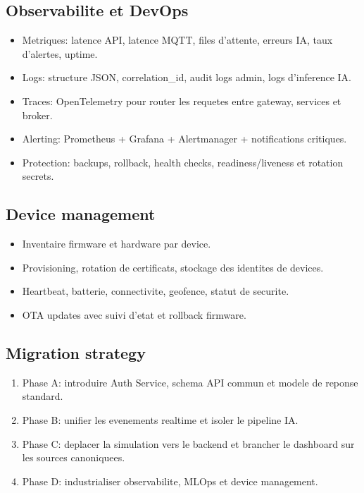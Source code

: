 \documentclass[12pt,a4paper]{article}
\begin{document}
\subsection{Observabilite et DevOps}
\begin{itemize}
  \item Metriques: latence API, latence MQTT, files d'attente, erreurs IA, taux d'alertes, uptime.
  \item Logs: structure JSON, correlation\_id, audit logs admin, logs d'inference IA.
  \item Traces: OpenTelemetry pour router les requetes entre gateway, services et broker.
  \item Alerting: Prometheus + Grafana + Alertmanager + notifications critiques.
  \item Protection: backups, rollback, health checks, readiness/liveness et rotation secrets.
\end{itemize}

\subsection{Device management}
\begin{itemize}
  \item Inventaire firmware et hardware par device.
  \item Provisioning, rotation de certificats, stockage des identites de devices.
  \item Heartbeat, batterie, connectivite, geofence, statut de securite.
  \item OTA updates avec suivi d'etat et rollback firmware.
\end{itemize}

\subsection{Migration strategy}
\begin{enumerate}
  \item Phase A: introduire Auth Service, schema API commun et modele de reponse standard.
  \item Phase B: unifier les evenements realtime et isoler le pipeline IA.
  \item Phase C: deplacer la simulation vers le backend et brancher le dashboard sur les sources canoniquees.
  \item Phase D: industrialiser observabilite, MLOps et device management.
\end{enumerate}
\end{document}

